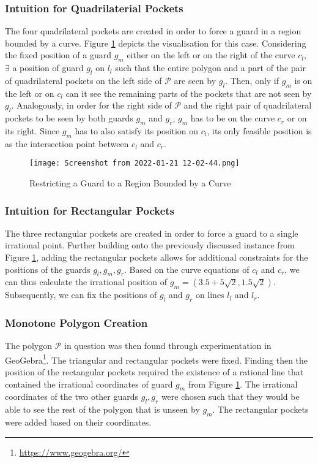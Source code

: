 \subsubsection{Intuition for Quadrilaterial Pockets}
The four quadrilateral pockets are created in order to force a guard in a region bounded by a curve. Figure \ref{fig:quadrilateral_pockets} depicts the visualisation for this case. Considering the fixed position of a guard $g_m$ either on the left or on the right of the curve $c_l$, $\exists$ a position of guard $g_l$ on $l_l$ such that the entire polygon and a part of the pair of quadrilateral pockets on the left side of $\mathcal P$ are seen by $g_l$. Then, only if $g_m$ is on the left or on $c_l$ can it see the remaining parts of the pockets that are not seen by $g_l$. Analogously, in order for the right side of $\mathcal P$ and the right pair of quadrilateral pockets to be seen by both guards $g_m$ and $g_r$, $g_m$ has to be on the curve $c_r$ or on its right. Since $g_m$ has to also satisfy its position on $c_l$, its only feasible position is as the intersection point between $c_l$ and $c_r$. 

\begin{figure}[h!]
    \centering
    \texttt{[image: Screenshot from 2022-01-21 12-02-44.png]}
    \caption{Restricting a Guard to a Region Bounded by a Curve}
    \label{fig:quadrilateral_pockets}
\end{figure}

\subsubsection{Intuition for Rectangular Pockets}
The three rectangular pockets are created in order to force a guard to a single irrational point. Further building onto the previously discussed instance from Figure \ref{fig:quadrilateral_pockets}, adding the rectangular pockets allows for additional constraints for the positions of the guards $g_l, g_m, g_r$. Based on the curve equations of $c_l$ and $c_r$, we can thus calculate the irrational position of $g_m = (3.5 + 5\sqrt 2, 1.5\sqrt 2)$. Subsequently, we can fix the positions of $g_l$ and $g_r$ on lines $l_l$ and $l_r$.

\subsubsection{Monotone Polygon Creation}
The polygon $\mathcal P$ in question  was then found through experimentation in GeoGebra\footnote{\url{https://www.geogebra.org/}}. The triangular and rectangular pockets were fixed. Finding then the position of the rectangular pockets required the existence of a rational line that contained the irrational coordinates of guard $g_m$ from Figure \ref{fig:quadrilateral_pockets}. The irrational coordinates of the two other guards $g_l, g_r$ were chosen such that they would be able to see the rest of the polygon that is unseen by $g_m$. The rectangular pockets were added based on their coordinates.

